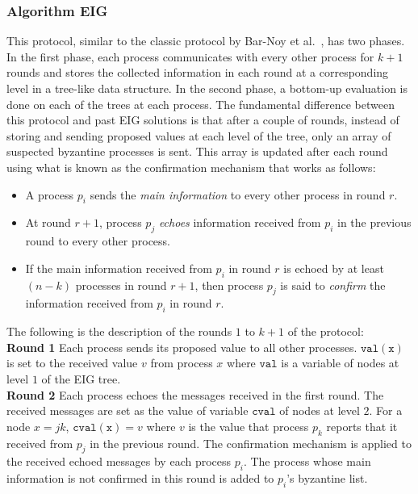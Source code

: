 \subsubsection{Algorithm EIG \cite{KM13}}
This protocol, similar to the classic protocol by Bar-Noy et al.~\cite{Bar-NoyD91}, has two phases. In the first phase, each process communicates with every other process for $k + 1$ rounds and stores the collected information in each round at a corresponding level in a tree-like data structure. In the second phase, a bottom-up evaluation is done on each of the trees at each process. The fundamental difference between this protocol and past EIG solutions is that after a couple of rounds, instead of storing and sending proposed values at each level of the tree, only an array of suspected byzantine processes is sent. This array is updated after each round using what is known as the confirmation mechanism that works as follows:
\begin{itemize}
\item A process $p_i$ sends the \textit{main information} to every other process in round $r$.
\item At round $r+1$, process $p_j$ \textit{echoes} information received from $p_i$ in the previous round to every other process. 
\item If the main information received from $p_i$ in round $r$ is echoed by at least $(n - k)$ processes in round $r+1$, then process $p_j$ is said to \textit{confirm} the information received from $p_i$ in round $r$.
    \end{itemize}
    The following is the description of the rounds $1$ to $k+1$ of the protocol: \\
    \textbf{Round 1} Each process sends its proposed value to all other processes. $\mathtt{val(x)}$ is set to the received value $v$ from process $x$ where $\mathtt{val}$ is a variable of nodes at level $1$ of the EIG tree. \\
    \textbf{Round 2} Each process echoes the messages received in the first round. The received messages are set as the value of variable $\mathtt{cval}$ of nodes at level $2$. For a node $x = jk$, $\mathtt{cval(x)} = v$ where $v$ is the value that process $p_k$ reports that it received from $p_j$ in the previous round. The confirmation mechanism is applied to the received echoed messages by each process $p_i$. The process whose main information is not confirmed in this round is added to $p_i$'s byzantine list. \\
